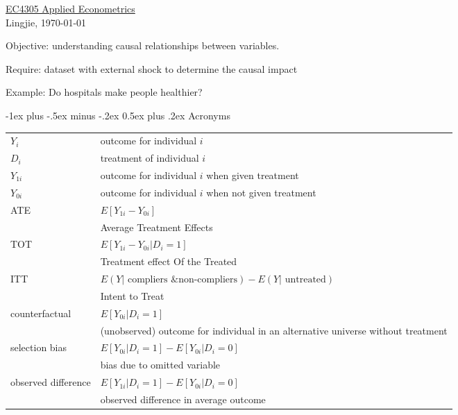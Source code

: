 \documentclass[a4paper,12pt,landscape]{article}
\makeatletter
\renewcommand{\section}{\@startsection{section}{1}{0mm}%
                                {-1ex plus -.5ex minus -.2ex}%
                                {0.5ex plus .2ex}%
                                {\normalfont\large\bfseries\color{red}}}
\makeatother
\begin{document}
\raggedright
\footnotesize
\begin{multicols}{3}


\setlength{\columnseprule}{0.25pt}
\setlength{\premulticols}{1pt}
\setlength{\postmulticols}{1pt}
\setlength{\multicolsep}{1pt}
\setlength{\columnsep}{2pt}

\begin{center}
     \Large{\underline{EC4305 Applied Econometrics}} \\
     {Lingjie, \today}
\end{center}

Objective: understanding causal relationships between variables.

Require: dataset with external shock to determine the causal impact

Example: Do hospitals make people healthier?

\section{Acronyms}

\begin{tabulary}{\linewidth}{l @{ : } L}
    $Y_i$ & outcome for individual $i$\\
    $D_i$ & treatment of individual $i$\\
    $Y_{1i}$ & outcome for individual $i$ when given treatment\\
    $Y_{0i}$ & outcome for individual $i$ when not given treatment\\
    ATE & $E\left[ Y_{1i} - Y_{0i}  \right]$\\ & Average Treatment Effects\\
    TOT & $E\left[ Y_{1i} - Y_{0i} | D_i = 1 \right]$ \\
        & Treatment effect Of the Treated\\
    ITT & $E(Y|\text{ compliers \& non-compliers}) - E(Y|\text{ untreated})$ \\
        & Intent to Treat\\
    counterfactual & $E\left[ Y_{0i} | D_i=1  \right]$\\
                   & (unobserved) outcome for individual in an alternative universe without treatment \\
    selection bias & $E\left[ Y_{0i}|D_i=1  \right] - E\left[ Y_{0i}|D_i=0  \right]$ \\
                   & bias due to omitted variable\\
    observed difference & $E\left[ Y_{1i}|D_i=1  \right] - E\left[ Y_{0i}|D_i=0  \right]$\\
                        & observed difference in average outcome
\end{tabulary}


\end{multicols}
\end{document}
